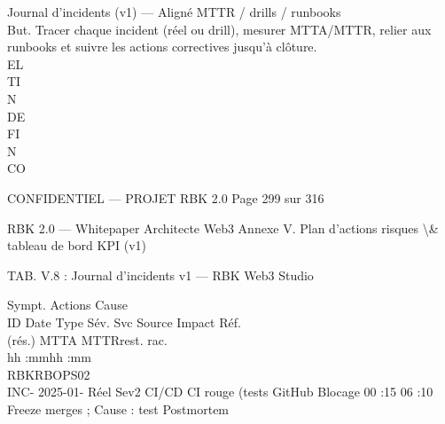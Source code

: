\documentclass[12pt,landscape,a4paper]{article}
\newenvironment{confidential}
{\begin{tcolorbox}[
    colback=rbkred!5!white,
    colframe=rbkred!75!black,
    title=CONFIDENTIEL,
    fonttitle=\bfseries\color{white},
    coltitle=rbkred!75!black,
    breakable,
    enhanced,
    frame hidden,
    borderline west={2pt}{0pt}{rbkred!75!black}
]}
{\end{tcolorbox}}
\begin{document}
Journal d’incidents (v1) — Aligné MTTR / drills / runbooks\\
But. Tracer chaque incident (réel ou drill), mesurer MTTA/MTTR, relier aux runbooks et suivre les actions correctives jusqu’à clôture.\\
\vspace{0.5em}
\vspace{0.5em}
\vspace{0.5em}
\vspace{0.5em}
EL\\
TI\\
N\\
DE\\
FI\\
N\\
CO\\
\vspace{0.5em}
\vspace{0.5em}
\vspace{0.5em}
\vspace{0.5em}
\begin{confidential}CONFIDENTIEL — PROJET RBK 2.0                                                             Page 299 sur 316\end{confidential}
RBK 2.0 — Whitepaper Architecte Web3                                                                     Annexe V. Plan d’actions risques \textbackslash{}& tableau de bord KPI (v1)\\
\vspace{0.5em}
\vspace{0.5em}
\begin{center}\begin{tabular}TAB. V.8 : Journal d’incidents v1 — RBK Web3 Studio\end{tabular}\end{center}
Sympt.                                                 Actions                  Cause\\
ID     Date     Type    Sév.    Svc                          Source    Impact                                                       Réf.\\
(rés.)                                        MTTA MTTRrest.                     rac.\\
hh :mmhh :mm\\
\vspace{0.5em}
RBKRBOPS02\\
INC- 2025-01- Réel      Sev2    CI/CD   CI rouge (tests      GitHub    Blocage       00 :15 06 :10 Freeze merges ;    Cause : test      Postmortem\\
\end{document}
